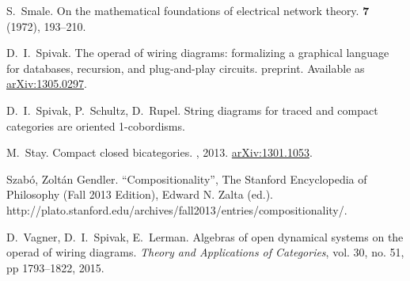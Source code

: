 \begin{thebibliography}{RSW00}
    S.\ Smale.
    \newblock On the mathematical foundations of electrical
    network theory.
     {\bf 7} (1972), 193--210. 




    D.\ I.\  Spivak.
    \newblock The operad of wiring diagrams:
    formalizing a graphical language for databases, recursion, and plug-and-play
    circuits.
    \newblock preprint.
    \newblock Available as
    \href{http://arxiv.org/abs/1305.0297}{arXiv:1305.0297}.

    D.\ I.\ Spivak, P.\ Schultz, D.\ Rupel.
    \newblock String diagrams for traced and compact categories are oriented 1-cobordisms.

    M.\ Stay.
    \newblock Compact closed bicategories.
    , 2013. 
    \newblock \href{http://arxiv.org/abs/1301.1053}{arXiv:1301.1053}.

    Szab\'o, Zolt\'an Gendler.
    \newblock ``Compositionality'', The Stanford Encyclopedia of Philosophy
    (Fall 2013 Edition), Edward N. Zalta (ed.).
    \newblock
    http://plato.stanford.edu/archives/fall2013/entries/compositionality/.


    D.\ Vagner, D.\ I.\ Spivak, E.\ Lerman.
    \newblock Algebras of open
    dynamical systems on the operad of wiring diagrams.
    \newblock \emph{Theory and
    Applications of Categories}, vol. 30, no. 51, pp 1793--1822, 2015. 



\end{thebibliography}
